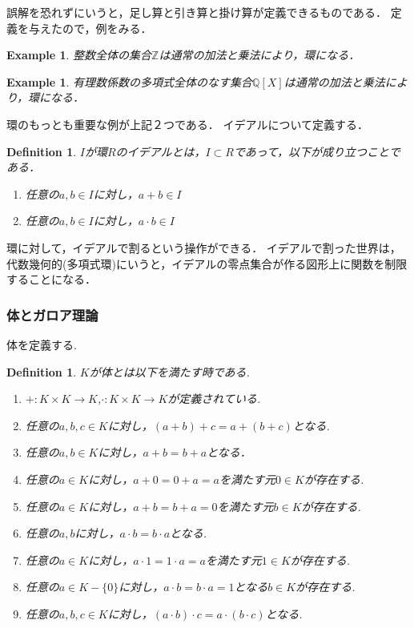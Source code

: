 \documentclass{ujarticle}
\newtheorem{dfn}[thm]{Definition}
\newtheorem{epl}[thm]{Example}
\begin{document}
誤解を恐れずにいうと，足し算と引き算と掛け算が定義できるものである．
定義を与えたので，例をみる．

\begin{epl}
 整数全体の集合$\mathbb{Z}$は通常の加法と乗法により，環になる．
\end{epl}

\begin{epl}
  有理数係数の多項式全体のなす集合$\mathbb{Q}[X]$は通常の加法と乗法により，環になる．
\end{epl}

環のもっとも重要な例が上記２つである．
イデアルについて定義する．
\begin{dfn}
 $I$が環$R$のイデアルとは，$I \subset R$であって，以下が成り立つことである．
 \begin{enumerate}
   \item 任意の$a,b \in I$に対し，$a + b \in I$
   \item 任意の$a,b \in I$に対し，$a \cdot b \in I$
 \end{enumerate}
\end{dfn}

環に対して，イデアルで割るという操作ができる．
イデアルで割った世界は，代数幾何的(多項式環)にいうと，イデアルの零点集合が作る図形上に関数を制限することになる．


\subsubsection{体とガロア理論}
\label{subs:体とガロア理論}

体を定義する.
\begin{dfn}

$K$が体とは以下を満たす時である.
  \begin{enumerate}
    \setlength{\parskip}{0cm} %
    \setlength{\itemsep}{0cm} %
    \item $+:K \times K \to K$,$\cdot:K \times K \to K $が定義されている.
    \item 任意の$a,b,c \in K$に対し，$(a + b) +c =a +(b +c)$となる.
    \item 任意の$a,b \in K$に対し，$a + b = b + a$となる．
    \item 任意の$a \in K$に対し，$a + 0 =  0 + a = a$を満たす元$0 \in K$が存在する.
    \item 任意の$a \in K$に対し，$a + b = b + a =0$を満たす元$b \in K $が存在する.
    \item 任意の$a,b$に対し，$a \cdot b = b \cdot a$となる.
    \item 任意の$a \in K$に対し，$a \cdot 1 = 1 \cdot a =a$を満たす元$1 \in K$が存在する.
    \item 任意の$a \in K-\{0\}$に対し，$a \cdot b = b \cdot a = 1$となる$b \in K$が存在する.
    \item 任意の$a,b,c \in K$に対し，$(a \cdot b) \cdot c =a \cdot (b \cdot c)$となる.
  \end{enumerate}
\end{dfn}
\end{document}
